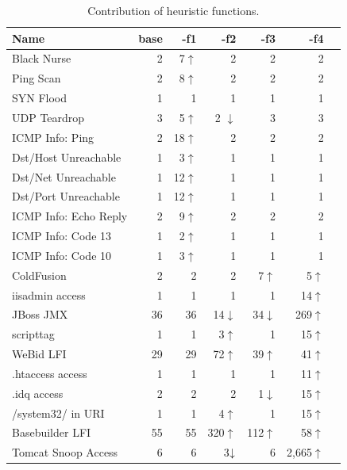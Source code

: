 \documentclass[conference]{IEEEtran}
\begin{document}
\begin{table}[t!]
  \footnotesize
  \setlength{\tabcolsep}{8pt}
  \renewcommand{\arraystretch}{0.5}
  \caption{\label{table:weights}Contribution of heuristic functions.}
  \vspace{-2ex}
  \centering
  \begin{tabular}{lrrrrrr}
    \toprule
    Name &
    base &
    -f1 &
    -f2 &    
    -f3 &
    -f4 \\
    \midrule
    Black Nurse & 2 & 7$\uparrow$ & 2 & 2 & 2 \\    
    Ping Scan & 2 &  8$\uparrow$& 2 & 2 & 2 \\
    SYN Flood & 1 & 1 & 1 & 1 & 1 \\
      UDP Teardrop & 3 & 5$\uparrow$ & 2 \cellcolor{lightgray}$\downarrow$ & 3 & 3 \\
    ICMP Info: Ping & 2 & 18$\uparrow$& 2 & 2 & 2 \\
    Dst/Host Unreachable & 1 & 3$\uparrow$ & 1 & 1 & 1 \\
    Dst/Net Unreachable & 1 & 12$\uparrow$ & 1 & 1 & 1 \\
    Dst/Port Unreachable & 1 & 12$\uparrow$ & 1 & 1 & 1 \\
    ICMP Info: Echo Reply & 2 & 9$\uparrow$ & 2 & 2 & 2 \\
    ICMP Info: Code 13 & 1 & 2$\uparrow$ & 1 & 1 & 1 \\
    ICMP Info: Code 10 & 1 & 3$\uparrow$ & 1 & 1 & 1 \\
    \midrule
    ColdFusion & 2 & 2 & 2 & 7$\uparrow$ & 5$\uparrow$ \\
    iisadmin access & 1  & 1 & 1 & 1 & 14$\uparrow$\\        
    JBoss JMX & 36 & 36 & 14\cellcolor{lightgray}$\downarrow$ & 34\cellcolor{lightgray}$\downarrow$ & 269$\uparrow$ \\
    scripttag & 1 & 1 & 3$\uparrow$ & 1 & 15$\uparrow$ \\
    WeBid LFI & 29 & 29 & 72$\uparrow$ & 39$\uparrow$ & 41$\uparrow$ \\    
    .htaccess access & 1  & 1 & 1 & 1 & 11$\uparrow$\\
    .idq access & 2  & 2 & 2 & 1\cellcolor{lightgray}$\downarrow$ & 15$\uparrow$ \\
    /system32/ in URI & 1  & 1 & 4$\uparrow$ & 1 & 15$\uparrow$\\
    Basebuilder LFI & 55  & 55 & 320$\uparrow$ & 112$\uparrow$ & 58$\uparrow$\\
      Tomcat Snoop Access & 6 & 6 & 3$\cellcolor{lightgray}\downarrow$ & 6 & 2,665$\uparrow$\\
    \bottomrule
  \end{tabular}
\end{table}
\end{document}
